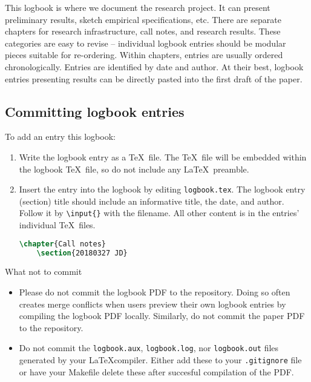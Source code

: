 
This logbook is where we document the research project.
It can present preliminary results, sketch empirical specifications, etc.
There are separate chapters for research infrastructure, call notes, and research results.
These categories are easy to revise -- individual logbook entries should be modular pieces suitable for re-ordering.
Within chapters, entries are usually ordered chronologically. Entries are identified by date and author.
At their best, logbook entries presenting results can be directly pasted into the first draft of the paper.

\subsection{Committing logbook entries}

To add an entry this logbook:
\begin{enumerate}
	\item Write the logbook entry as a \TeX\ file. The \TeX\ file will be embedded within the logbook \TeX\ file, so do not include any \LaTeX\ preamble.
	\item Insert the entry into the logbook by editing \texttt{logbook.tex}.
	The logbook entry (section) title should include an informative title, the date, and author. 
	Follow it by \texttt{\textbackslash input\{\}} with the filename.
	All other content is in the entries' individual \TeX\ files.
	\begin{lstlisting}[language=tex]
	\chapter{Call notes}
	\section{20180327 JD} 
	\end{lstlisting}
\end{enumerate}

What not to commit 
\begin{itemize}
	\item Please do not commit the logbook PDF to the repository. 
	Doing so often creates merge conflicts when users preview their own logbook entries by compiling the logbook PDF locally.
	Similarly, do not commit the paper PDF to the repository.
	\item Do not commit the \texttt{logbook.aux}, \texttt{logbook.log}, nor \texttt{logbook.out} files generated by your \LaTeX compiler.
	Either add these to your \texttt{.gitignore} file or have your Makefile delete these after succesful compilation of the PDF.
\end{itemize}

